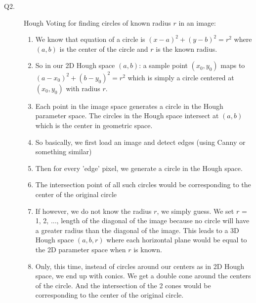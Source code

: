 \documentclass{csc_assignment4}
\begin{document}
\begin{description}
\item[Q2.] 
Hough Voting for finding circles of known radius $r$ in an image:
\begin{enumerate}
\item We know that equation of a circle is $(x-a)^{2} + (y-b)^{2} = r^{2}$ where $(a,b)$ is the center of the circle and $r$ is the known radius. 
\item So in our 2D Hough space $(a,b)$: a sample point $(x_{0}, y_{0})$ maps to $(a-x_{0})^{2} + (b-y_{0})^{2} = r^{2}$ which is simply a circle centered at $(x_{0}, y_{0})$ with radius $r$.
\item Each point in the image space generates a circle in the Hough parameter space. The circles in the Hough space intersect at  $(a,b)$ which is the center in geometric space. 
\item So basically, we first load an image and detect edges (using Canny or something similar)\item Then for every 'edge' pixel, we generate a circle in the Hough space.
\item The intersection point of all such circles would be corresponding to the center of the original circle
\item If however, we do not know the radius $r$, we simply guess. We set $r$ = 1, 2, ..., length of the diagonal of the image because no circle will have a greater radius than the diagonal of the image. This leads to a 3D Hough space $(a, b, r)$ where each horizontal plane would be equal to the 2D parameter space when $r$ is known. 
\item Only, this time, instead of circles around our centers as in 2D Hough space, we end up with conics. We get a double cone around the centers of the circle. And the intersection of the 2 cones would be corresponding to the center of the original circle.
\end{enumerate}


\end{description}
\end{document}
